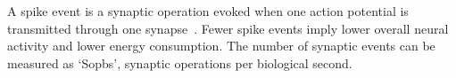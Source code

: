 A spike event is a synaptic operation evoked when one action potential is transmitted through one synapse~\citep{sharp2012power}.
Fewer spike events imply lower overall neural activity and lower energy consumption.
The number of synaptic events can be measured as `Sopbs', synaptic operations per biological second.
%			

